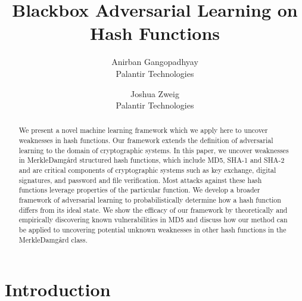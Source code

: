 

\date{}

\title{\Large \bf Blackbox Adversarial Learning on Hash Functions}

\author{
{\rm Anirban Gangopadhyay}\\
Palantir Technologies
\and
{\rm Joshua Zweig}\\
Palantir Technologies
} %

\maketitle

\begin{abstract}
We present a novel machine learning framework which we apply here to uncover weaknesses in hash functions. Our framework extends the definition of adversarial learning to the domain of cryptographic systems. In this paper, we uncover weaknesses in Merkle{\textendash}Damg\r{a}rd structured hash functions, which include MD5, SHA-1 and SHA-2 and are critical components of cryptographic systems such as key exchange, digital signatures, and password and file verification. Most attacks against these hash functions leverage properties of the particular function. We develop a broader framework of adversarial learning to probabilistically determine how a hash function differs from its ideal state. We show the efficacy of our framework by theoretically and empirically discovering known vulnerabilities in MD5 and discuss how our method can be applied to uncovering potential unknown weaknesses in other hash functions in the Merkle{\textendash}Damg\r{a}rd class.
\end{abstract}

\section{Introduction}

